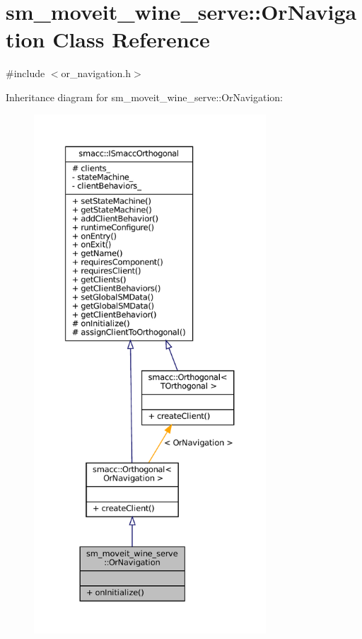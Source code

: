\hypertarget{classsm__moveit__wine__serve_1_1OrNavigation}{}\section{sm\+\_\+moveit\+\_\+wine\+\_\+serve\+:\+:Or\+Navigation Class Reference}
\label{classsm__moveit__wine__serve_1_1OrNavigation}


{\ttfamily \#include $<$or\+\_\+navigation.\+h$>$}



Inheritance diagram for sm\+\_\+moveit\+\_\+wine\+\_\+serve\+:\+:Or\+Navigation\+:
\nopagebreak
\begin{figure}[H]
\begin{center}
\leavevmode
\includegraphics[height=550pt]{classsm__moveit__wine__serve_1_1OrNavigation__inherit__graph}
\end{center}
\end{figure}


